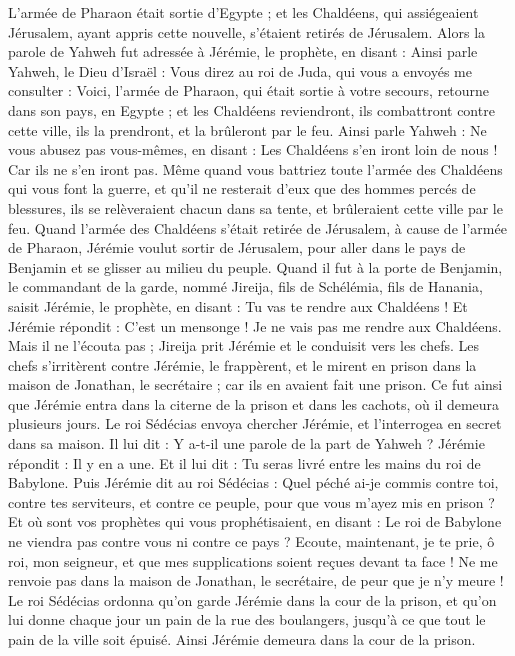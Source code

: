 \begin{multicols}{2}
L'armée de Pharaon était sortie d'Egypte ; et les Chaldéens, qui assiégeaient Jérusalem, ayant appris cette nouvelle, s’étaient retirés de Jérusalem.
Alors la parole de Yahweh fut adressée à Jérémie, le prophète, en disant :
Ainsi parle Yahweh, le Dieu d'Israël : Vous direz au roi de Juda, qui vous a envoyés me consulter : Voici, l'armée de Pharaon, qui était sortie à votre secours, retourne dans son pays, en Egypte ;
et les Chaldéens reviendront, ils combattront contre cette ville, ils la prendront, et la brûleront par le feu.
Ainsi parle Yahweh : Ne vous abusez pas vous-mêmes, en disant : Les Chaldéens s’en iront loin de nous ! Car ils ne s'en iront pas.
Même quand vous battriez toute l'armée des Chaldéens qui vous font la guerre, et qu'il ne resterait d’eux que des hommes percés de blessures, ils se relèveraient chacun dans sa tente, et brûleraient cette ville par le feu.
Quand l'armée des Chaldéens s’était retirée de Jérusalem, à cause de l'armée de Pharaon,
Jérémie voulut sortir de Jérusalem, pour aller dans le pays de Benjamin et se glisser au milieu du peuple.
Quand il fut à la porte de Benjamin, le commandant de la garde, nommé Jireija, fils de Schélémia, fils de Hanania, saisit Jérémie, le prophète, en disant : Tu vas te rendre aux Chaldéens !
Et Jérémie répondit : C'est un mensonge !  Je ne vais pas me rendre aux Chaldéens. Mais il ne l'écouta pas ; Jireija prit Jérémie et le conduisit vers les chefs.
Les chefs s’irritèrent contre Jérémie, le frappèrent, et le mirent en prison dans la maison de Jonathan, le secrétaire ; car ils en avaient fait une prison.
Ce fut ainsi que Jérémie entra dans la citerne de la prison et dans les cachots, où il demeura plusieurs jours.
Le roi Sédécias envoya chercher Jérémie, et l'interrogea en secret dans sa maison. Il lui dit : Y a-t-il une parole de la part de Yahweh ? Jérémie répondit : Il y en a une. Et il lui dit : Tu seras livré entre les mains du roi de Babylone.
Puis Jérémie dit au roi Sédécias : Quel péché ai-je commis contre toi, contre tes serviteurs, et contre ce peuple, pour que vous m'ayez mis en prison ?
Et où sont vos prophètes qui vous prophétisaient, en disant : Le roi de Babylone ne viendra pas contre vous ni contre ce pays ?
Ecoute, maintenant, je te prie, ô roi, mon seigneur, et que mes supplications soient reçues devant ta face ! Ne me renvoie pas dans la maison de Jonathan, le secrétaire, de peur que je n'y meure !
Le roi Sédécias ordonna qu'on garde Jérémie dans la cour de la prison, et qu'on lui donne chaque jour un pain de la rue des boulangers, jusqu’à ce que tout le pain de la ville soit épuisé. Ainsi Jérémie demeura dans la cour de la prison.

\end{multicols}
